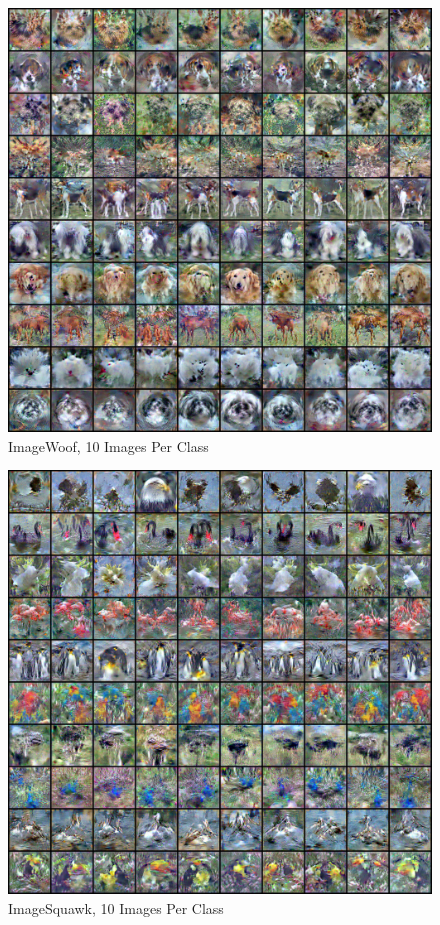 \documentclass[main.tex]{subfiles}
\begin{document}
\begin{figure}
    \centering
    \includegraphics[width=\linewidth]{figures/imagenet_10/imagewoof_all.pdf}
    \caption{ImageWoof, 10 Images Per Class}
    \label{fig:woof_10}
\end{figure}
\begin{figure}
    \centering
    \includegraphics[width=\linewidth]{figures/imagenet_10/imagesquawk_all.pdf}
    \caption{ImageSquawk, 10 Images Per Class}
    \label{fig:squawk_10}
\end{figure}
\end{document}
